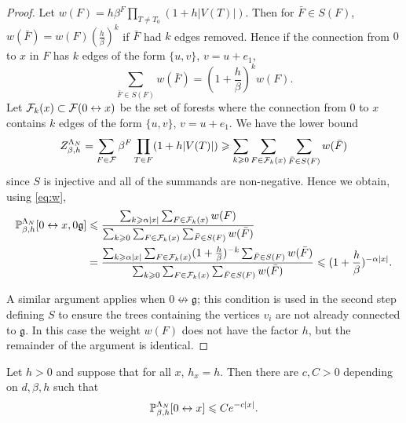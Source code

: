 \documentclass[11pt]{amsart}
\numberwithin{equation}{section}
\numberwithin{theorem}{section}
\newcommand{\ghost}{\mathfrak{g}}
\newcommand{\conn}{\leftrightarrow}
\newcommand{\nconn}{\not\leftrightarrow}
\newcommand{\1}{{\bf 1}}
\begin{document}
\begin{proof}
  Let $w(F)= h \beta^{F}\prod_{T\neq T_0}(1+h|V(T)|)$.
  Then for $\bar F \in S(F)$, $w(\bar F) = w(F) (\frac{h}{\beta})^{k}$ if
  $\bar F$ had $k$ edges removed. Hence if the connection from $0$ to
  $x$ in $F$ has $k$ edges of the form $\{u,v\}$, $v=u+e_{1}$, 
  \begin{equation}
    \label{eq:w}
    \sum_{\bar F\in S(F)}w(\bar F) = (1+\frac{h}{\beta})^{k}w(F).
  \end{equation}
  Let $\cF_{k}(x) \subset \cF(0\conn x)$ be the set of forests where the connection
  from $0$ to $x$ contains $k$ edges of the form $\{u,v\}$,
  $v=u+e_{1}$. We have the lower bound
  \begin{equation}
    \label{eq:pfbound}
    Z_{\beta,h}^{\Lambda_{N}} = \sum_{F\in\mathcal F} \beta^{F}\prod_{T\in
      F}(1+h|V(T)|) \geqslant \sum_{k\geqslant 0} \sum_{F\in \mathcal F_{k}(x)} \sum_{\bar
      F\in S(F)} w(\bar F) 
  \end{equation}
  since $S$ is injective and all of the summands are
  non-negative. Hence we obtain, using \eqref{eq:w},
  \begin{align}
    \P^{\Lambda_{N}}_{\beta,h}[0\conn x,0\ghost] 
    &\leq \frac{\sum_{k\geq \alpha |x|} \sum_{F\in \cF_{k}(x)}
      w(F)}{\sum_{k\geq 0} \sum_{F\in \cF_{k}(x)} \sum_{\bar
      F\in S(F)} w(\bar F)} \nnb
    &= \frac{\sum_{k\geq \alpha |x|} \sum_{F\in \cF_{k}(x)}
      (1+\frac{h}{\beta})^{-k}\sum_{\bar F\in S(F)}w(\bar
      F)}{\sum_{k\geq 0} \sum_{F\in \cF_{k}(x)} \sum_{\bar 
      F\in S(F)} w(\bar F)}
    \leq (1+\frac{h}{\beta})^{-\alpha |x|}.
    \label{e:x0g}
  \end{align}
  
  A similar argument applies when $0\nconn\ghost$; this condition is
  used in the second step defining $S$ to ensure the trees containing
  the vertices $v_{i}$ are not already connected to $\ghost$. In this
  case the weight $w(F)$ does not have the factor $h$, but the
  remainder of the argument is identical.
\end{proof}
\begin{proposition}
  \label{prop:DecayH}
  Let $h>0$ and suppose that for all $x$, $h_x= h$.
  Then there are $c,C>0$ depending on $d,\beta,h$ such that 
  \begin{equation}
    \label{eq:DecayH2}
    \P^{\Lambda_{N}}_{\beta,h}[0\conn x] \leq Ce^{-c |x |}.
  \end{equation}
\end{proposition}
\end{document}
